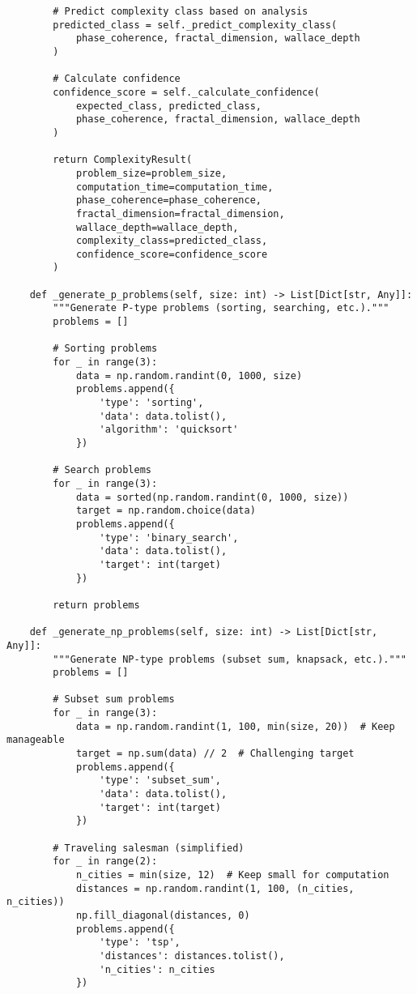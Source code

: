 \documentclass[12pt]{article}
\begin{document}
\begin{lstlisting}
        # Predict complexity class based on analysis
        predicted_class = self._predict_complexity_class(
            phase_coherence, fractal_dimension, wallace_depth
        )

        # Calculate confidence
        confidence_score = self._calculate_confidence(
            expected_class, predicted_class,
            phase_coherence, fractal_dimension, wallace_depth
        )

        return ComplexityResult(
            problem_size=problem_size,
            computation_time=computation_time,
            phase_coherence=phase_coherence,
            fractal_dimension=fractal_dimension,
            wallace_depth=wallace_depth,
            complexity_class=predicted_class,
            confidence_score=confidence_score
        )

    def _generate_p_problems(self, size: int) -> List[Dict[str, Any]]:
        """Generate P-type problems (sorting, searching, etc.)."""
        problems = []

        # Sorting problems
        for _ in range(3):
            data = np.random.randint(0, 1000, size)
            problems.append({
                'type': 'sorting',
                'data': data.tolist(),
                'algorithm': 'quicksort'
            })

        # Search problems
        for _ in range(3):
            data = sorted(np.random.randint(0, 1000, size))
            target = np.random.choice(data)
            problems.append({
                'type': 'binary_search',
                'data': data.tolist(),
                'target': int(target)
            })

        return problems

    def _generate_np_problems(self, size: int) -> List[Dict[str, Any]]:
        """Generate NP-type problems (subset sum, knapsack, etc.)."""
        problems = []

        # Subset sum problems
        for _ in range(3):
            data = np.random.randint(1, 100, min(size, 20))  # Keep manageable
            target = np.sum(data) // 2  # Challenging target
            problems.append({
                'type': 'subset_sum',
                'data': data.tolist(),
                'target': int(target)
            })

        # Traveling salesman (simplified)
        for _ in range(2):
            n_cities = min(size, 12)  # Keep small for computation
            distances = np.random.randint(1, 100, (n_cities, n_cities))
            np.fill_diagonal(distances, 0)
            problems.append({
                'type': 'tsp',
                'distances': distances.tolist(),
                'n_cities': n_cities
            })


\end{lstlisting}
\end{document}
